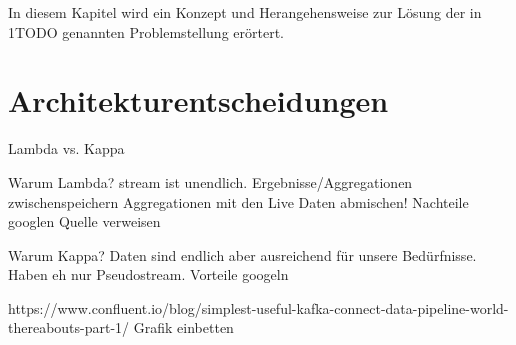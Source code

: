 In diesem Kapitel wird ein Konzept und Herangehensweise zur Lösung der in 1TODO genannten Problemstellung erörtert.

\section{Architekturentscheidungen}

Lambda vs. Kappa

Warum Lambda?
stream ist unendlich. Ergebnisse/Aggregationen zwischenspeichern
Aggregationen mit den Live Daten abmischen!
Nachteile googlen
Quelle verweisen

Warum Kappa?
Daten sind endlich aber ausreichend für unsere Bedürfnisse.
Haben eh nur Pseudostream.
Vorteile googeln

https://www.confluent.io/blog/simplest-useful-kafka-connect-data-pipeline-world-thereabouts-part-1/
Grafik einbetten

